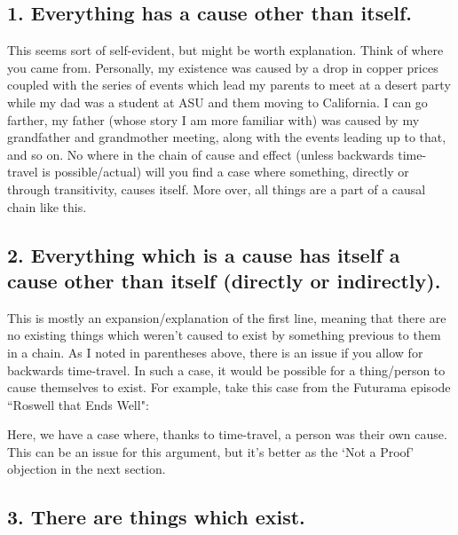 \subsection{1. Everything has a cause other than itself.}

This seems sort of self-evident, but might be worth explanation. Think of where you came from. Personally, my existence was caused by a drop in copper prices coupled with the series of events which lead my parents to meet at a desert party while my dad was a student at ASU and them moving to California. I can go farther, my father (whose story I am more familiar with) was caused by my grandfather and grandmother meeting, along with the events leading up to that, and so on. No where in the chain of cause and effect (unless backwards time-travel is possible/actual) will you find a case where something, directly or through transitivity, causes itself. More over, all things are a part of a causal chain like this. 

\subsection{2. Everything which is a cause has itself a cause other than itself (directly or indirectly).}

This is mostly an expansion/explanation of the first line, meaning that there are no existing things which weren't caused to exist by something previous to them in a chain. As I noted in parentheses above, there is an issue if you allow for backwards time-travel. In such a case, it would be possible for a thing/person to cause themselves to exist. For example, take this case from the Futurama episode ``Roswell that Ends Well":


Here, we have a case where, thanks to time-travel, a person was their own cause. This can be an issue for this argument, but it's better as the `Not a Proof' objection in the next section. 

\subsection{3. There are things which exist.}

